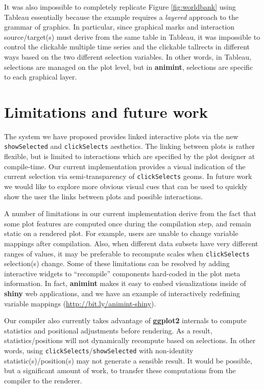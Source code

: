 \documentclass[12pt,]{article}
\theoremstyle{definition}
\theoremstyle{definition}
\theoremstyle{definition}
\theoremstyle{remark}
\begin{document}
It was also impossible to completely replicate Figure
\ref{fig:worldbank} using Tableau essentially because the example
requires a \emph{layered} approach to the grammar of graphics. In
particular, since graphical marks and interaction source/target(s) must
derive from the same table in Tableau, it was impossible to control the
clickable multiple time series and the clickable tallrects in different
ways based on the two different selection variables. In other words, in
Tableau, selections are managed on the plot level, but in
\textbf{animint}, selections are specific to each graphical layer.

\hypertarget{limitations}{%
\section{Limitations and future work}\label{limitations}}

The system we have proposed provides linked interactive plots via the
new \texttt{showSelected} and \texttt{clickSelects} aesthetics. The
linking between plots is rather flexible, but is limited to interactions
which are specified by the plot designer at compile-time. Our current
implementation provides a visual indication of the current selection via
semi-transparency of \texttt{clickSelects} geoms. In future work we
would like to explore more obvious visual cues that can be used to
quickly show the user the links between plots and possible interactions.

A number of limitations in our current implementation derive from the
fact that some plot features are computed once during the compilation
step, and remain static on a rendered plot. For example, users are
unable to change variable mappings after compilation. Also, when
different data subsets have very different ranges of values, it may be
preferable to recompute scales when \texttt{clickSelects} selection(s)
change. Some of these limitations can be resolved by adding interactive
widgets to ``recompile'' components hard-coded in the plot meta
information. In fact, \textbf{animint} makes it easy to embed
visualizations inside of \textbf{shiny} web applications, and we have an
example of interactively redefining variable mappings
(\url{http://bit.ly/animint-shiny}).

Our compiler also currently takes advantage of \textbf{ggplot2}
internals to compute statistics and positional adjustments before
rendering. As a result, statistics/positions will not dynamically
recompute based on selections. In other words, using
\texttt{clickSelects}/\texttt{showSelected} with non-identity
statistic(s)/position(s) may not generate a sensible result. It would be
possible, but a significant amount of work, to transfer these
computations from the compiler to the renderer.
\end{document}
